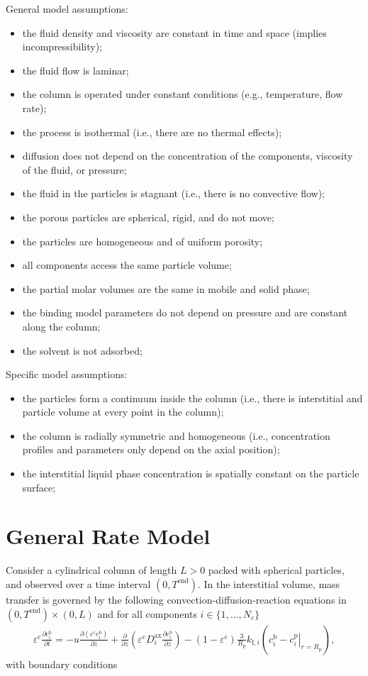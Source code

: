 \documentclass{article}
\begin{document}
General model assumptions:
\begin{itemize}
\item the fluid density and viscosity are constant in time and space (implies incompressibility);
\item the fluid flow is laminar;
\item the column is operated under constant conditions (e.g., temperature, flow rate);
\item the process is isothermal (i.e., there are no thermal effects);
\item diffusion does not depend on the concentration of the components, viscosity of the fluid, or pressure;
\item the fluid in the particles is stagnant (i.e., there is no convective flow);
\item the porous particles are spherical, rigid, and do not move;
\item the particles are homogeneous and of uniform porosity;
\item all components access the same particle volume;
\item the partial molar volumes are the same in mobile and solid phase;
\item the binding model parameters do not depend on pressure and are constant along the column;
\item the solvent is not adsorbed;
\end{itemize}


Specific model assumptions:
\begin{itemize}
\item the particles form a continuum inside the column (i.e., there is interstitial and particle volume at every point in the column);
\item the column is radially symmetric and homogeneous (i.e., concentration profiles and parameters only depend on the axial position);
\item the interstitial liquid phase concentration is spatially constant on the particle surface;
\end{itemize}


\section*{General Rate Model}
Consider a cylindrical column of length $L > 0$ packed with spherical particles, and observed over a time interval $(0, T^{\mathrm{end}})$.
In the interstitial volume, mass transfer is governed by the following convection-diffusion-reaction equations in $(0, T^\mathrm{end})\times (0, L)$ and for all components $i\in\{1, \dots, N_c\}$
\begin{align}
\varepsilon^{\mathrm{c}} \frac{\partial c^{\mathrm{b}}_i}{\partial t} = - u \frac{\partial \left( \varepsilon^{\mathrm{c}} c^{\mathrm{b}}_i \right)}{\partial z} + \frac{\partial}{\partial z} \left( \varepsilon^{\mathrm{c}} D^{\mathrm{ax}}_{i} \frac{\partial c^{\mathrm{b}}_i}{\partial z} \right)- \left(1 - \varepsilon^{\mathrm{c}} \right) \frac{3}{R_{\mathrm{p}}} k_{\mathrm{f},i} \left(c^{\mathrm{b}}_i - \left. c^{\mathrm{p}}_{i} \right|_{r = R_{\mathrm{p}}} \right),
\end{align}
with boundary conditions
\end{document}
